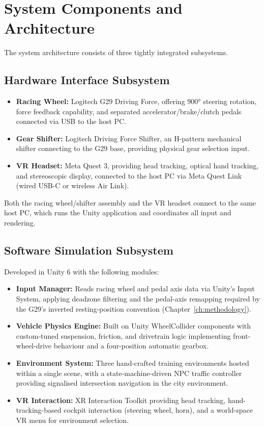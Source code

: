 \section{System Components and Architecture}

The system architecture consists of three tightly integrated subsystems.

\subsection{Hardware Interface Subsystem}
\begin{itemize}
    \item \textbf{Racing Wheel:} Logitech G29 Driving Force, offering 900° steering rotation, force feedback capability, and separated accelerator/brake/clutch pedals connected via USB to the host PC.
    \item \textbf{Gear Shifter:} Logitech Driving Force Shifter, an H-pattern mechanical shifter connecting to the G29 base, providing physical gear selection input.
    \item \textbf{VR Headset:} Meta Quest 3, providing head tracking, optical hand tracking, and stereoscopic display, connected to the host PC via Meta Quest Link (wired USB-C or wireless Air Link).
\end{itemize}

Both the racing wheel/shifter assembly and the VR headset connect to the same host PC, which runs the Unity application and coordinates all input and rendering.

\subsection{Software Simulation Subsystem}
Developed in Unity 6 with the following modules:
\begin{itemize}
    \item \textbf{Input Manager:} Reads racing wheel and pedal axis data via Unity's Input System, applying deadzone filtering and the pedal-axis remapping required by the G29's inverted resting-position convention (Chapter~\ref{ch:methodology}).
    \item \textbf{Vehicle Physics Engine:} Built on Unity WheelCollider components with custom-tuned suspension, friction, and drivetrain logic implementing front-wheel-drive behaviour and a four-position automatic gearbox.
    \item \textbf{Environment System:} Three hand-crafted training environments hosted within a single scene, with a state-machine-driven NPC traffic controller providing signalised intersection navigation in the city environment.
    \item \textbf{VR Interaction:} XR Interaction Toolkit providing head tracking, hand-tracking-based cockpit interaction (steering wheel, horn), and a world-space VR menu for environment selection.
\end{itemize}

